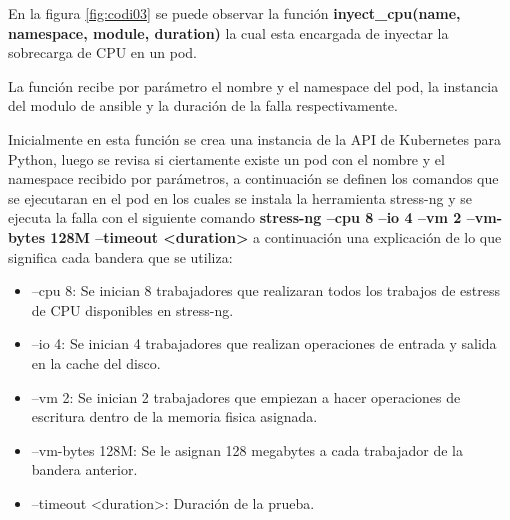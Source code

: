 \par En la figura \ref{fig:codi03} se puede observar la función \textbf{ inyect\_cpu(name, namespace, module, duration)} la cual esta encargada de inyectar la sobrecarga de CPU en un pod.\\
\par La función recibe por parámetro el nombre y el namespace del pod, la instancia del modulo de ansible y la duración de la falla respectivamente. \\
\par Inicialmente en esta función se crea una instancia de la API de Kubernetes para Python, luego se revisa si ciertamente existe un pod con el nombre y el namespace recibido por parámetros, a continuación se definen los comandos que se ejecutaran en el pod en los cuales se instala la herramienta stress-ng y se ejecuta la falla con el siguiente comando 
\textbf{stress-ng --cpu 8 --io 4 --vm 2 --vm-bytes 128M --timeout <duration>} a continuación una explicación de lo que significa cada bandera que se utiliza:
\begin{itemize}
        \item --cpu 8: Se inician 8 trabajadores que realizaran todos los trabajos de estress de CPU disponibles en stress-ng.
        \item --io 4: Se inician 4 trabajadores que realizan operaciones de entrada y salida en la cache del disco.
        \item --vm 2: Se inician 2 trabajadores que empiezan a hacer operaciones de escritura dentro de la memoria fisica asignada.        
        \item --vm-bytes 128M: Se le asignan 128 megabytes a cada trabajador de la bandera anterior.
        \item --timeout <duration>: Duración de la prueba.\\
    \end{itemize}

